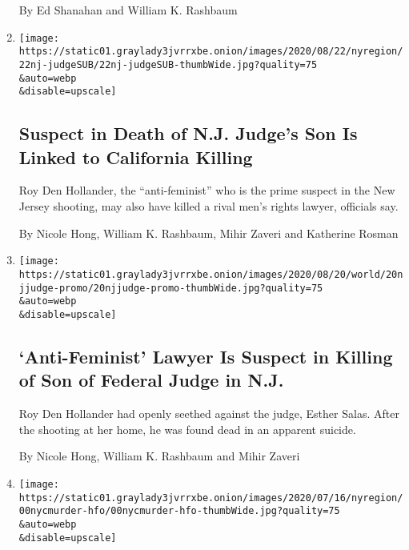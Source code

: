 \begin{enumerate}
  By Ed Shanahan and William K. Rashbaum
\item
  \href{/2020/07/22/nyregion/roy-den-hollander-esther-salas.html}{}

  \texttt{[image: https://static01.graylady3jvrrxbe.onion/images/2020/08/22/nyregion/22nj-judgeSUB/22nj-judgeSUB-thumbWide.jpg?quality=75\\\&auto=webp\\\&disable=upscale]}

  \hypertarget{suspect-in-death-of-nj-judges-son-is-linked-to-california-killing}{%
  \subsection{Suspect in Death of N.J. Judge's Son Is Linked to
  California
  Killing}\label{suspect-in-death-of-nj-judges-son-is-linked-to-california-killing}}

  Roy Den Hollander, the ``anti-feminist'' who is the prime suspect in
  the New Jersey shooting, may also have killed a rival men's rights
  lawyer, officials say.

  By Nicole Hong, William K. Rashbaum, Mihir Zaveri and Katherine Rosman
\item
  \href{/2020/07/20/nyregion/esther-salas.html}{}

  \texttt{[image: https://static01.graylady3jvrrxbe.onion/images/2020/08/20/world/20njjudge-promo/20njjudge-promo-thumbWide.jpg?quality=75\\\&auto=webp\\\&disable=upscale]}

  \hypertarget{anti-feminist-lawyer-is-suspect-in-killing-of-son-of-federal-judge-in-nj}{%
  \subsection{`Anti-Feminist' Lawyer Is Suspect in Killing of Son of
  Federal Judge in
  N.J.}\label{anti-feminist-lawyer-is-suspect-in-killing-of-son-of-federal-judge-in-nj}}

  Roy Den Hollander had openly seethed against the judge, Esther Salas.
  After the shooting at her home, he was found dead in an apparent
  suicide.

  By Nicole Hong, William K. Rashbaum and Mihir Zaveri
\item
  \href{/2020/07/17/nyregion/fahim-saleh-suspect-tyrese-devon-haspil.html}{}

  \texttt{[image: https://static01.graylady3jvrrxbe.onion/images/2020/07/16/nyregion/00nycmurder-hfo/00nycmurder-hfo-thumbWide.jpg?quality=75\\\&auto=webp\\\&disable=upscale]}

  \hypertarget{tech-ceos-former-assistant-charged-with-his-grisly-murder}{%
}
\end{enumerate}
